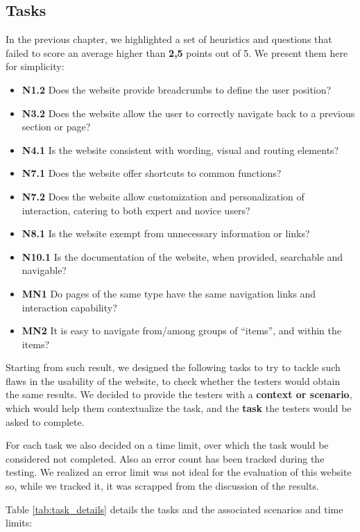 \subsection{Tasks}
In the previous chapter, we highlighted a set of heuristics and questions that failed to score an average higher than \textbf{2,5} points out of 5. We present them here for simplicity:
\begin{itemize}
	\item \textbf{N1.2} Does the website provide breadcrumbs to define the user position?
	\item \textbf{N3.2} Does the website allow the user to correctly navigate back to a previous section or page?
	\item \textbf{N4.1} Is the website consistent with wording, visual and routing elements?
	\item \textbf{N7.1} Does the website offer shortcuts to common functions?
	\item \textbf{N7.2} Does the website allow customization and personalization of interaction, catering to both expert and novice users?
	\item \textbf{N8.1} Is the website exempt from unnecessary information or links?
	\item \textbf{N10.1} Is the documentation of the website, when provided, searchable and navigable?
	\item \textbf{MN1} Do pages of the same type have the same navigation links and interaction capability?
	\item \textbf{MN2} It is easy to navigate from/among groups of “items”, and within the items?
\end{itemize}

Starting from such result, we designed the following tasks to try to tackle such flaws in the usability of the website, to check whether the testers would obtain the same results. We decided to provide the testers with a \textbf{context or scenario}, which would help them contextualize the task, and the \textbf{task} the testers would be asked to complete.

For each task we also decided on a time limit, over which the task would be considered not completed. Also an error count has been tracked during the testing. We realized an error limit was not ideal for the evaluation of this website so, while we tracked it, it was scrapped from the discussion of the results.

Table \ref{tab:task_details} details the tasks and the associated scenarios and time limits:

